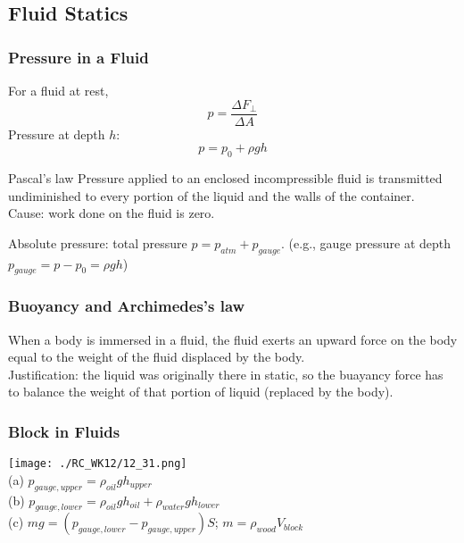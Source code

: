\subsection{Fluid Statics}
\begin{frame}
\frametitle{Pressure in a Fluid}
For a fluid at rest,
\[p=\frac{\Delta F_\perp}{\Delta A}\]
Pressure at \alert{depth} $h$:
\[p=p_0+\rho g h\]
\begin{block}{Pascal's law}
Pressure applied to an \alert{enclosed incompressible fluid} is \alert{transmitted} undiminished to every portion of the liquid and the walls of the container.\\
Cause: work done on the fluid is zero.
\end{block}
Absolute pressure: total pressure $p=p_{atm}+p_{gauge}$. (e.g., gauge pressure at depth $p_{gauge}=p-p_0=\rho g h$)
\end{frame}
\begin{frame}
\frametitle{Buoyancy and Archimedes's law}
When a body is \alert{immersed} in a fluid, the fluid exerts an upward force on the body equal to the weight of the fluid \alert{displaced} by the body.\\
Justification: the liquid was originally there in static, so the buayancy force has to \alert{balance} the weight of that portion of liquid (replaced by the body).
\end{frame}
\begin{frame}
\frametitle{Block in Fluids}
\begin{multicols}{2}
\texttt{[image: ./RC\_WK12/12\_31.png]}\\
(a) $p_{gauge,upper}=\rho_{oil}gh_{upper}$\\
(b) $p_{gauge,lower}=\rho_{oil}gh_{oil}+\rho_{water}gh_{lower}$\\
(c) $mg=(p_{gauge,lower}-p_{gauge,upper})S$; $m=\rho_{wood}V_{block}$
\end{multicols}
\end{frame}

